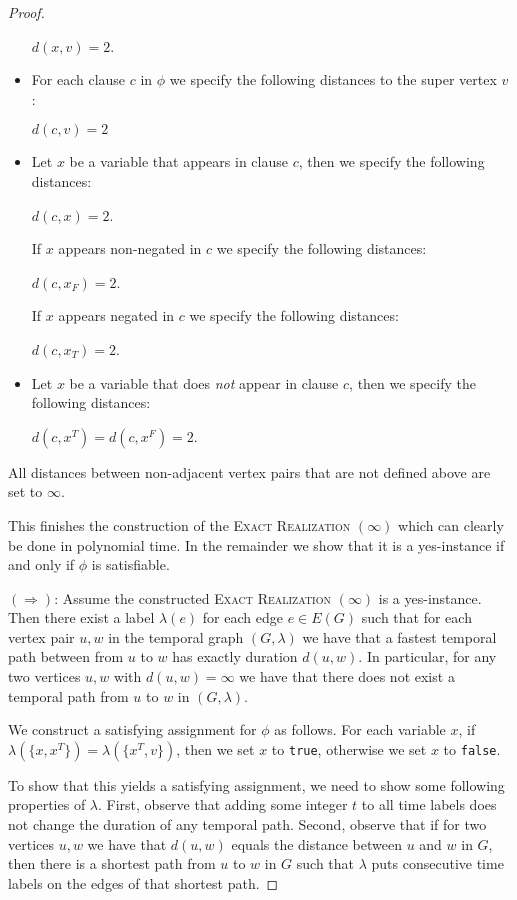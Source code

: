 \documentclass[11pt,a4paper]{article}
\theoremstyle{remark}
\theoremstyle{definition}
\begin{document}
\begin{proof}
\begin{itemize}
    $d(x,v)=2$. %

    \item For each clause $c$ in $\phi$ we specify the following distances to the super vertex $v$:

    $d(c,v)=2$
    \item Let $x$ be a variable that appears in clause $c$, then  we specify the following distances:

    $d(c,x)=2$.
    
    If $x$ appears non-negated in $c$ we specify the following distances:

    $d(c,x_F)=2$.

    If $x$ appears negated in $c$ we specify the following distances:

    $d(c,x_T)=2$.
    \item Let $x$ be a variable that does \emph{not} appear in clause $c$, then we specify the following distances:

    $d(c,x^T)=d(c,x^F)=2$.
\end{itemize}
All distances between non-adjacent vertex pairs that are not defined above are set to $\infty$.

This finishes the construction of the \textsc{Exact Realization $(\infty)$} which can clearly be done in polynomial time. In the remainder we show that it is a yes-instance if and only if $\phi$ is satisfiable.

$(\Rightarrow)$: Assume the constructed \textsc{Exact Realization $(\infty)$} is a yes-instance. Then there exist a label $\lambda(e)$ for each edge $e\in E(G)$ such that for each vertex pair $u,w$ in the temporal graph $(G,\lambda)$ we have that a fastest temporal path between from $u$ to $w$ has exactly duration $d(u,w)$. In particular, for any two vertices $u,w$ with $d(u,w)=\infty$ we have that there does not exist a temporal path from $u$ to $w$ in $(G,\lambda)$.

We construct a satisfying assignment for $\phi$ as follows. For each variable $x$, if $\lambda(\{x,x^T\})=\lambda(\{x^T,v\})$, then we set $x$ to \texttt{true}, otherwise we set $x$ to \texttt{false}.

To show that this yields a satisfying assignment, we need to show some following properties of $\lambda$.
First, observe that adding some integer $t$ to all time labels does not change the duration of any temporal path. Second, observe that if for two vertices $u,w$ we have that $d(u,w)$ equals the distance between $u$ and $w$ in $G$, then there is a shortest path from $u$ to $w$ in $G$ such that $\lambda$ puts consecutive time labels on the edges of that shortest path. 


\end{proof}
\end{document}
